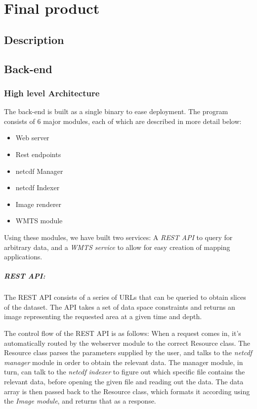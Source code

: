 \documentclass[11pt,a4paper,titlepage,oneside]{report}
\begin{document}
\chapter{Final product}
\section{Description}
\section{Back-end}
\subsection{High level Architecture}
The \gls{back-end} is built as a single binary to ease deployment. The program consists of 6 major modules, each of which are described in more detail below:
\begin{itemize}
	\item Web server
	\item Rest endpoints
	\item \gls{netcdf} Manager
	\item \gls{netcdf} Indexer
	\item Image renderer
	\item \gls{WMTS} module
\end{itemize}  

Using these modules, we have built two services: A \textit{REST \gls{API}} to query for arbitrary data, and a \textit{\gls{WMTS} service} to allow for easy creation of mapping applications.


\paragraph{REST API:}
The REST \gls{API} consists of a series of \gls{URL}s that can be queried to obtain slices of the dataset. The \gls{API} takes a set of data space constraints and returns an image representing the requested area at a given time and depth.

The control flow of the REST \gls{API} is as follows:  
When a request comes in, it's automatically routed by the webserver module to the correct Resource class. The Resource class parses the parameters supplied by the user, and talks to the \textit{\gls{netcdf} manager} module in order to obtain the relevant data.
The manager module, in turn, can talk to the \textit{\gls{netcdf} indexer} to figure out which specific file contains the relevant data, before opening the given file and reading out the data. 
The data array is then passed back to the Resource class, which formats it according using the \textit{Image module}, and returns that as a response.
\end{document}
